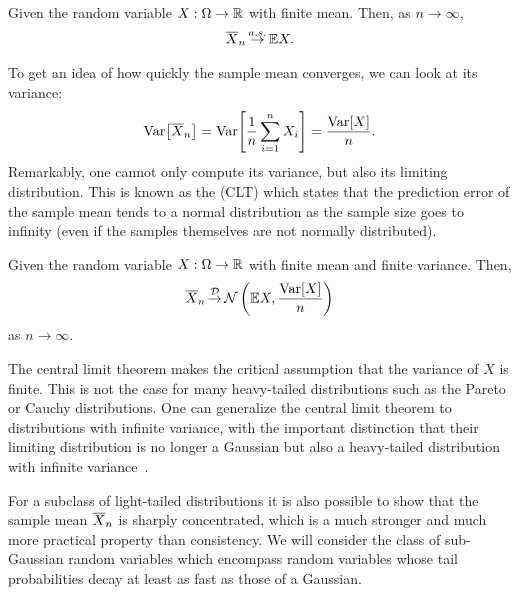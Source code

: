 \begin{thmb}
  \begin{fct}
    Given the random variable $X : \Omega \to \mathbb{R}$ with finite mean.
    Then, as $n\to\infty$, \begin{align}
      \mean{X}_n \almostsurely \E*{X}. \label{eq:slln}
    \end{align}
  \end{fct}
\end{thmb}

To get an idea of how quickly the sample mean converges, we can look at its variance: \begin{align}
  \Var{\mean{X}_n} = \Var{\frac{1}{n} \sum_{i=1}^n X_i} = \frac{\Var{X}}{n}.
\end{align}
Remarkably, one cannot only compute its variance, but also its limiting distribution.
This is known as the  (CLT) which states that the prediction error of the sample mean tends to a normal distribution as the sample size goes to infinity (even if the samples themselves are not normally distributed).

\begin{thmb}
  \begin{fct}
    Given the random variable $X : \Omega \to \mathbb{R}$ with finite mean and finite variance.
    Then, \begin{align}
      \mean{X}_n \convd \N*{\E*{X}}{\frac{\Var{X}}{n}}
    \end{align} as $n\to\infty$.
  \end{fct}
\end{thmb}

The central limit theorem makes the critical assumption that the variance of $X$ is finite.
This is not the case for many heavy-tailed distributions such as the Pareto or Cauchy distributions.
One can generalize the central limit theorem to distributions with infinite variance, with the important distinction that their limiting distribution is no longer a Gaussian but also a heavy-tailed distribution with infinite variance~\citep{nair2022fundamentals}.

For a subclass of light-tailed distributions it is also possible to show that the sample mean $\overline{X}_n$ is sharply concentrated, which is a much stronger and much more practical property than consistency.
We will consider the class of sub-Gaussian random variables which encompass random variables whose tail probabilities decay at least as fast as those of a Gaussian.


